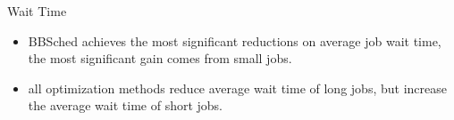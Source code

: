 \documentclass[aspectratio=1610]{beamer}
\begin{document}
\begin{frame}{Wait Time}
    \begin{figure} \centering
    \label{fig}
    \end{figure}
    \begin{itemize}
        \item BBSched achieves the most significant reductions on average job
            wait time, the most significant gain comes from small jobs.
        \item all optimization methods reduce average wait time of long jobs, but increase the average wait time of short jobs. 
    \end{itemize}
\end{frame}
\end{document}
